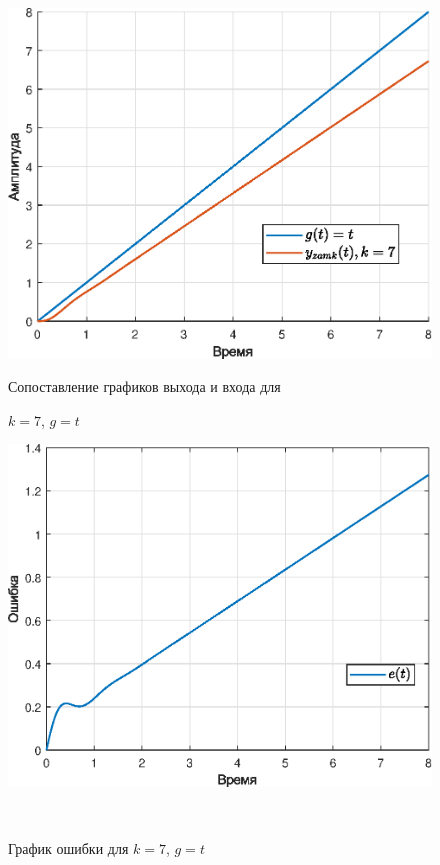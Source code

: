 \documentclass[a4paper]{article}
\begin{document}
\begin{figure}[H]
    \begin{minipage}{0.5\textwidth}
        \centering \includegraphics[width=\textwidth]{ex3/k7_g_vt.eps}
        \caption{Сопоставление графиков выхода и входа для}
        \centerline{$k=7$, $g=t$}
    \end{minipage}\hfill
    \begin{minipage}{0.5\textwidth}
        \centering \includegraphics[width=\textwidth]{ex3/k7_g_vt_error.eps}
        \caption{График ошибки для $k=7$, $g=t$}
    \end{minipage}\\[1em]
\end{figure}\noindent\
\end{document}
